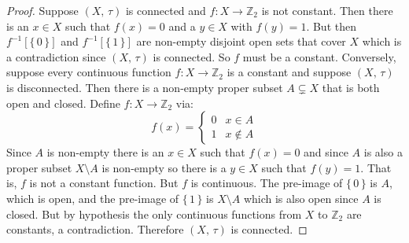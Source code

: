 \documentclass{article}
\theoremstyle{plain}
\theoremstyle{normal}
\begin{document}
        \begin{proof}
            Suppose $(X,\,\tau)$ is connected and $f:X\rightarrow\mathbb{Z}_{2}$
            is not constant. Then there is an $x\in{X}$ such that
            $f(x)=0$ and a $y\in{X}$ with $f(y)=1$. But then
            $f^{-1}[\{\,0\,\}]$ and $f^{-1}[\{\,1\,\}]$ are non-empty disjoint
            open sets that cover $X$ which is a contradiction since $(X,\,\tau)$
            is connected. So $f$ must be a constant. Conversely, suppose every
            continuous function $f:X\rightarrow\mathbb{Z}_{2}$ is a constant
            and suppose $(X,\,\tau)$ is disconnected. Then there is a non-empty
            proper subset $A\subsetneq{X}$ that is both open and closed.
            Define $f:X\rightarrow\mathbb{Z}_{2}$ via:
            \begin{equation}
                f(x)=
                \begin{cases}
                    0&x\in{A}\\
                    1&x\notin{A}
                \end{cases}
            \end{equation} 
            Since $A$ is non-empty there is an $x\in{X}$ such that $f(x)=0$ and
            since $A$ is also a proper subset $X\setminus{A}$ is non-empty so
            there is a $y\in{X}$ such that $f(y)=1$. That is, $f$ is not a
            constant function. But $f$ is continuous. The pre-image of
            $\{\,0\,\}$ is $A$, which is open, and the pre-image of $\{\,1\,\}$
            is $X\setminus{A}$ which is also open since $A$ is closed. But by
            hypothesis the only continuous functions from $X$ to
            $\mathbb{Z}_{2}$ are constants, a contradiction. Therefore
            $(X,\,\tau)$ is connected.
        \end{proof}
\end{document}
